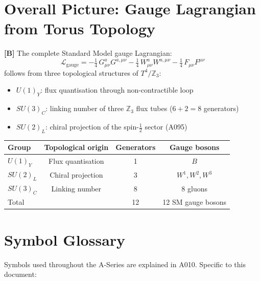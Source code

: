 \section{Overall Picture: Gauge Lagrangian from Torus Topology}

\textbf{[B]} The complete Standard Model gauge Lagrangian:
\[
  \mathcal{L}_\text{gauge}
  = -\tfrac14\,G_{\mu\nu}^a G^{a,\mu\nu}
  - \tfrac14\,W_{\mu\nu}^a W^{a,\mu\nu}
  - \tfrac14\,F_{\mu\nu}F^{\mu\nu}
\]
follows from three topological structures of $T^4/\mathbb{Z}_3$:
\begin{itemize}[leftmargin=2em,itemsep=2pt,topsep=2pt]
  \item $U(1)_Y$: flux quantisation through non-contractible loop
  \item $SU(3)_C$: linking number of three $\mathbb{Z}_3$ flux tubes
    ($6+2=8$ generators)
  \item $SU(2)_L$: chiral projection of the spin-$\tfrac12$ sector (A095)
\end{itemize}

\begin{center}
\renewcommand{\arraystretch}{1.3}
{\small\begin{tabular}{lccc}
\toprule
Group & Topological origin & Generators & Gauge bosons \\
\midrule
$U(1)_Y$    & Flux quantisation  & 1 & $B$ \\
$SU(2)_L$   & Chiral projection  & 3 & $W^1,W^2,W^3$ \\
$SU(3)_C$   & Linking number     & 8 & 8 gluons \\
\midrule
Total & & 12 & 12 SM gauge bosons \\
\bottomrule
\end{tabular}}
\renewcommand{\arraystretch}{1.0}
\end{center}

\section{Symbol Glossary}

Symbols used throughout the A-Series are explained in A010.
Specific to this document:

